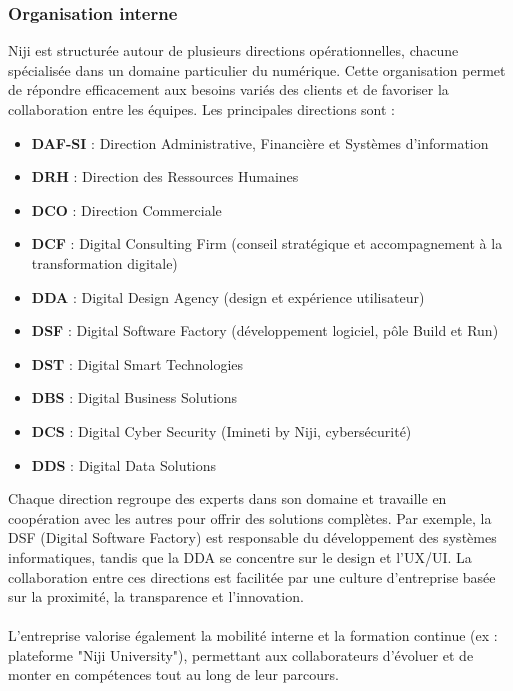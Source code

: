 \documentclass[12pt]{article}
\begin{document}
\subsubsection{Organisation interne}
Niji est structurée autour de plusieurs directions opérationnelles, chacune spécialisée dans un domaine particulier du numérique. Cette organisation permet de répondre efficacement aux besoins variés des clients et de favoriser la collaboration entre les équipes. Les principales directions sont :
\\
\begin{itemize}
    \item \textbf{DAF-SI} : Direction Administrative, Financière et Systèmes d'information
    \item \textbf{DRH} : Direction des Ressources Humaines
    \item \textbf{DCO} : Direction Commerciale
    \item \textbf{DCF} : Digital Consulting Firm (conseil stratégique et accompagnement à la transformation digitale)
    \item \textbf{DDA} : Digital Design Agency (design et expérience utilisateur)
    \item \textbf{DSF} : Digital Software Factory (développement logiciel, pôle Build et Run)
    \item \textbf{DST} : Digital Smart Technologies
    \item \textbf{DBS} : Digital Business Solutions
    \item \textbf{DCS} : Digital Cyber Security (Imineti by Niji, cybersécurité)
    \item \textbf{DDS} : Digital Data Solutions\\
\end{itemize}
\noindent
Chaque direction regroupe des experts dans son domaine et travaille en coopération avec les autres pour offrir des solutions complètes.
Par exemple, la DSF (Digital Software Factory) est responsable du développement des systèmes informatiques, tandis que la DDA se concentre sur le design et l’UX/UI.
La collaboration entre ces directions est facilitée par une culture d’entreprise basée sur la proximité, la transparence et l’innovation.
\\\\
L’entreprise valorise également la mobilité interne et la formation continue (ex : plateforme "Niji University"), permettant aux collaborateurs d’évoluer et de monter en compétences tout au long de leur parcours.
\end{document}
